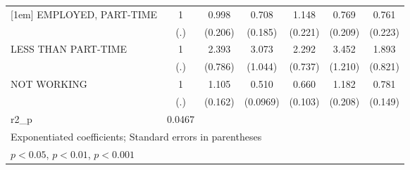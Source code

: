 {\begin{tabular}{l*{6}{c}}
[1em]
EMPLOYED, PART-TIME           &         1         &     0.998         &     0.708         &     1.148         &     0.769         &     0.761         \\
                              &       (.)         &   (0.206)         &   (0.185)         &   (0.221)         &   (0.209)         &   (0.223)         \\
[1em]
LESS THAN PART-TIME           &         1         &     2.393\sym{**} &     3.073\sym{***}&     2.292\sym{**} &     3.452\sym{***}&     1.893         \\
                              &       (.)         &   (0.786)         &   (1.044)         &   (0.737)         &   (1.210)         &   (0.821)         \\
[1em]
NOT WORKING                   &         1         &     1.105         &     0.510\sym{***}&     0.660\sym{**} &     1.182         &     0.781         \\
                              &       (.)         &   (0.162)         &  (0.0969)         &   (0.103)         &   (0.208)         &   (0.149)         \\
\hline
r2\_p                          &    0.0467         &                   &                   &                   &                   &                   \\
\hline\hline
\multicolumn{7}{l}{\footnotesize Exponentiated coefficients; Standard errors in parentheses}\\
\multicolumn{7}{l}{\footnotesize \sym{*} \(p<0.05\), \sym{**} \(p<0.01\), \sym{***} \(p<0.001\)}\\
\end{tabular}
}
